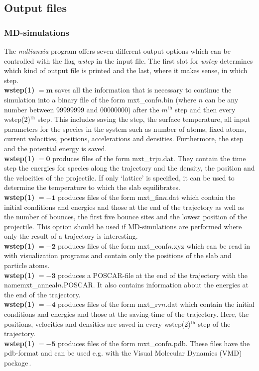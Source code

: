 \documentclass[twoside, 11pt, titlepage, captions=nooneline, a4paper, headsepline]{scrbook}%
\begin{document}
\subsection{Output files}
\label{Sec:mxt:output}
\subsubsection{MD-simulations}
The \textit{mdtianxia}-program offers seven different output options which can be controlled with the flag \textit{wstep} in the input file. The first slot for \textit{wstep} determines which kind of output file is printed and the last, where it makes sense, in which step.
\\
\textbf{wstep(1)} $\mathbf{=m}$ saves all the information that is necessary to continue the simulation into a binary file of the form mxt\_conf$n$.bin (where $n$ can be any number between 99999999 and 00000000) after the $m^\mathrm{th}$ step and then every wstep(2)$^\mathrm{th}$ step. This includes saving the step, the surface temperature, all input parameters for the species in the system such as number of atoms, fixed atoms, current velocities, positions, accelerations and densities. Furthermore, the step and the potential energy is saved.\\
\textbf{wstep(1)} $\mathbf{=0}$ produces files of the form mxt\_trj$n$.dat. They contain the time step the energies for species along the trajectory and the density, the position and the velocities of the projectile. If only `lattice' is specified, it can be used to determine the temperature to which the slab equilibrates.\\
\textbf{wstep(1)} $\mathbf{=-1}$ produces files of the form mxt\_fin$n$.dat which contain the initial conditions and energies and those at the end of the trajectory as well as the number of bounces, the first five bounce sites and the lowest position of the projectile. This option should be used if MD-simulations are performed where only the result of a trajectory is interesting.\\ 
\textbf{wstep(1)} $\mathbf{=-2}$ produces files of the form mxt\_conf$n$.xyz which can be read in with visualization programs and contain only the positions of the slab and particle atoms.\\
\textbf{wstep(1)} $\mathbf{=-3}$ produces a POSCAR-file at the end of the trajectory with the name\linebreak mxt\_anneal$n$.POSCAR. It also contains information about the energies at the end of the trajectory.\\
\textbf{wstep(1)} $\mathbf{=-4}$ produces files of the form mxt\_rv$n$.dat which contain the initial conditions and energies and those at the saving-time of the trajectory. Here, the positions, velocities and densities are saved in every wstep(2)$^\mathrm{th}$ step of the trajectory.\\
\textbf{wstep(1)} $\mathbf{=-5}$ produces files of the form mxt\_conf$n$.pdb. These files have the pdb-format and can be used e.g. with the Visual Molecular Dynamics (VMD) package\,\cite{humphrey1996}.
\end{document}
